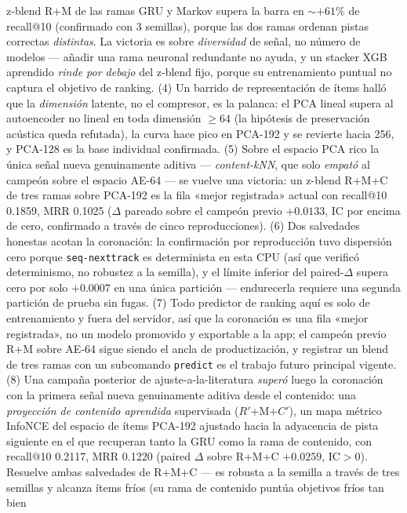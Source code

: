 \documentclass[11pt]{article}
\newcommand{\Rp}{\ensuremath{R'}}
\newcommand{\Cp}{\ensuremath{C'}}
\begin{document}
z-blend R+M de las ramas GRU y Markov supera la barra en $\sim$$+61\%$ de
recall@10 (confirmado con 3 semillas), porque las dos ramas ordenan pistas
correctas \emph{distintas}. La victoria es sobre \emph{diversidad} de señal, no
número de modelos --- añadir una rama neuronal redundante no ayuda, y un stacker
XGB aprendido \emph{rinde por debajo} del z-blend fijo, porque su entrenamiento
puntual no captura el objetivo de ranking. (4) Un barrido de representación de
ítems halló que la \emph{dimensión} latente, no el compresor, es la palanca: el
PCA lineal supera al autoencoder no lineal en toda dimensión $\ge 64$ (la
hipótesis de preservación acústica queda refutada), la curva hace pico en PCA-192
y se revierte hacia 256, y PCA-128 es la base individual confirmada. (5) Sobre el
espacio PCA rico la única señal nueva genuinamente aditiva --- \emph{content-kNN},
que solo \emph{empató} al campeón sobre el espacio AE-64 --- se vuelve una
victoria: un z-blend R+M+C de tres ramas sobre PCA-192 es la fila «mejor
registrada» actual con recall@10 \num{0.1859}, MRR \num{0.1025} ($\Delta$ pareado
sobre el campeón previo $+\num{0.0133}$, IC por encima de cero, confirmado a
través de cinco reproducciones). (6) Dos salvedades honestas acotan la
coronación: la confirmación por reproducción tuvo dispersión cero porque
\texttt{seq-nexttrack} es determinista en esta CPU (así que verificó
determinismo, no robustez a la semilla), y el límite inferior del paired-$\Delta$
supera cero por solo $+\num{0.0007}$ en una única partición --- endurecerla
requiere una segunda partición de prueba sin fugas. (7) Todo predictor de ranking
aquí es solo de entrenamiento y fuera del servidor, así que la coronación es una
fila «mejor registrada», no un modelo promovido y exportable a la app; el campeón
previo R+M sobre AE-64 sigue siendo el ancla de productización, y registrar un
blend de tres ramas con un subcomando \texttt{predict} es el trabajo futuro
principal vigente.
(8) Una campaña posterior de ajuste-a-la-literatura \emph{superó} luego la
coronación con la primera señal nueva genuinamente aditiva desde el contenido: una
\emph{proyección de contenido aprendida} supervisada (\Rp+M+\Cp), un mapa métrico
InfoNCE del espacio de ítems PCA-192 ajustado hacia la adyacencia de pista siguiente
en el que recuperan tanto la GRU como la rama de contenido, con recall@10
\num{0.2117}, MRR \num{0.1220} (paired $\Delta$ sobre R+M+C $+\num{0.0259}$, IC$>$0).
Resuelve ambas salvedades de R+M+C --- es robusta a la semilla a través de tres
semillas y alcanza ítems fríos (su rama de contenido puntúa objetivos fríos tan bien
$$
\end{document}
